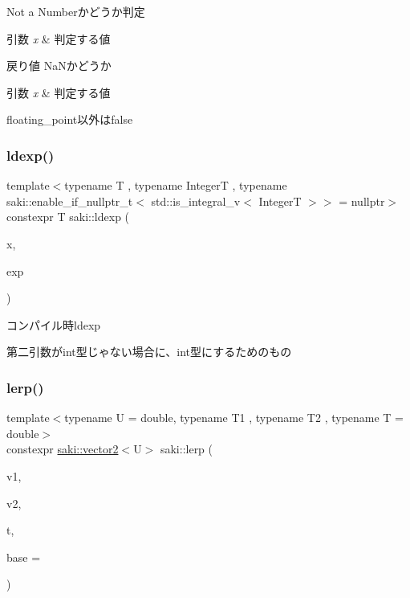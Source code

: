 Not a Numberかどうか判定 


\begin{DoxyParams}{引数}
{\em x} & 判定する値 \\
\hline
\end{DoxyParams}
\begin{DoxyReturn}{戻り値}
Na\+Nかどうか
\end{DoxyReturn}

\begin{DoxyParams}{引数}
{\em x} & 判定する値\\
\hline
\end{DoxyParams}
floating\+\_\+point以外はfalse \mbox{\label{namespacesaki_a03b7a22945dcbce6e2bb0593025c90c4}} 
\subsubsection{\texorpdfstring{ldexp()}{ldexp()}}
{\footnotesize\ttfamily template$<$typename T , typename IntegerT , typename saki\+::enable\+\_\+if\+\_\+nullptr\+\_\+t$<$ std\+::is\+\_\+integral\+\_\+v$<$ Integer\+T $>$$>$  = nullptr$>$ \\
constexpr T saki\+::ldexp (\begin{DoxyParamCaption}\item[{T}]{x,  }\item[{IntegerT}]{exp }\end{DoxyParamCaption})}



コンパイル時ldexp 

第二引数がint型じゃない場合に、int型にするためのもの \mbox{\label{namespacesaki_aca2e4449261f40ee6f47abc49844e66c}} 
\subsubsection{\texorpdfstring{lerp()}{lerp()}\hspace{0.1cm}{\footnotesize\ttfamily [1/3]}}
{\footnotesize\ttfamily template$<$typename U  = double, typename T1 , typename T2 , typename T  = double$>$ \\
constexpr \mbox{\hyperlink{classsaki_1_1vector2}{saki\+::vector2}}$<$U$>$ saki\+::lerp (\begin{DoxyParamCaption}\item[{const \mbox{\hyperlink{classsaki_1_1vector2}{saki\+::vector2}}$<$ T1 $>$ \&}]{v1,  }\item[{const \mbox{\hyperlink{classsaki_1_1vector2}{saki\+::vector2}}$<$ T2 $>$ \&}]{v2,  }\item[{const T \&}]{t,  }\item[{const T \&}]{base = {} }\end{DoxyParamCaption})}




